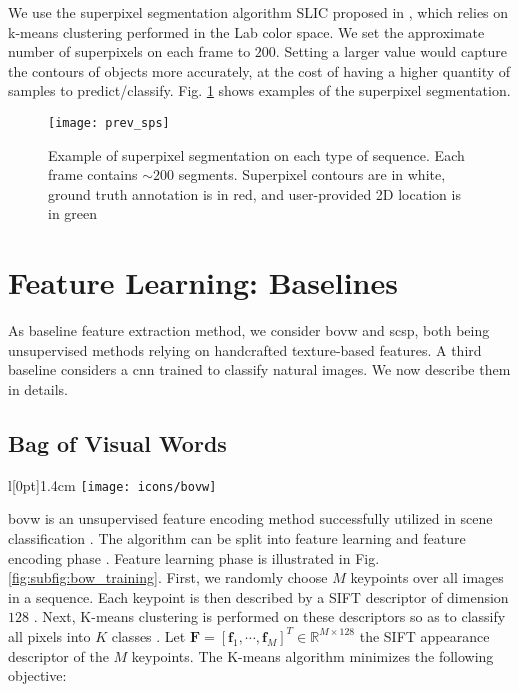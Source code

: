 We use the superpixel segmentation algorithm SLIC proposed in \cite{achanta12}, which relies on k-means clustering performed in the Lab color space.
We set the approximate number of superpixels on each frame to $200$.
Setting a larger value would capture the contours of objects more accurately, at the cost of having a higher quantity of samples to predict/classify.
Fig. \ref{fig:sp_example} shows examples of the superpixel segmentation.

\begin{figure}[htbp]
  \centering
  \texttt{[image: prev\_sps]}
  \caption[Superpixel segmentation example]{Example of superpixel segmentation on each type of sequence. Each frame contains $\sim 200$ segments.
  Superpixel contours are in white, ground truth annotation is in red, and user-provided 2D location is in green}
  \label{fig:sp_example}
\end{figure}


\section{Feature Learning: Baselines} \label{ch:baselines}
As baseline feature extraction method, we consider \gls{bovw} and \gls{scsp}, both being unsupervised methods relying on handcrafted texture-based features.
A third baseline considers a \gls{cnn} trained to classify natural images.
We now describe them in details.

\subsection{Bag of Visual Words} \label{bow}
\begingroup
\setlength\intextsep{0pt}
\begin{wrapfigure}[4]{l}[0pt]{1.4cm}
\texttt{[image: icons/bovw]}
\end{wrapfigure}

\gls{bovw} is an unsupervised feature encoding method successfully utilized in scene classification \cite{zhang15}.
The algorithm can be split into feature learning and feature encoding phase \cite{cheriyadat14}.
Feature learning phase is illustrated in Fig. \ref{fig:subfig:bow_training}.
First, we randomly choose $M$ keypoints over all images in a sequence.
Each keypoint is then described by a SIFT descriptor of dimension $128$ \cite{lowe04}.
Next, K-means clustering is performed on these descriptors so as to classify all pixels into $K$ classes \cite{lloyd1982}.
Let $\boldsymbol{F} = [\boldsymbol{f}_1,\cdots,\boldsymbol{f}_M]^T \in \mathbb{R}^{M \times 128}$ the SIFT appearance descriptor of the $M$ keypoints.
The K-means algorithm minimizes the following objective:

